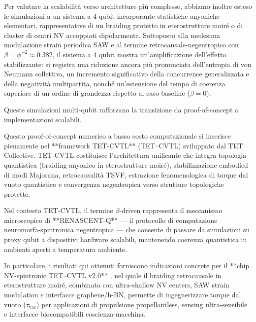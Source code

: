 \documentclass[11pt,a4paper]{article}
\theoremstyle{plain}
\theoremstyle{definition}
\begin{document}
Per valutare la scalabilità verso architetture più complesse, abbiamo inoltre esteso le simulazioni a un sistema a 4 qubit incorporante statistiche anyoniche elementari, rappresentative di un braiding protetto in eterostrutture moiré o di cluster di centri NV accoppiati dipolarmente. Sottoposto alla medesima modulazione strain periodica SAW e al termine retrocausale-negentropico con $\beta = \phi^{-2} \approx 0.382$, il sistema a 4 qubit mostra un'amplificazione dell'effetto stabilizzante: si registra una riduzione ancora più pronunciata dell'entropia di von Neumann collettiva, un incremento significativo della concurrence generalizzata e della negatività multipartita, nonché un'estensione del tempo di coerenza superiore di un ordine di grandezza rispetto al caso baseline ($\beta=0$). 



Queste simulazioni multi-qubit rafforzano la transizione da proof-of-concept a implementazioni scalabili.

\vspace{0.2cm}

Questo proof-of-concept numerico a basso costo computazionale si inserisce pienamente nel **framework TET-CVTL** (TET–CVTL) sviluppato dal TET Collective. TET-CVTL costituisce l’architettura unificante che integra topologia quantistica (braiding anyonico in eterostrutture moiré), stabilizzazione embodied di modi Majorana, retrocausalità TSVF, estrazione fenomenologica di torque dal vuoto quantistico e convergenza negentropica verso strutture topologiche protette. 

\vspace{0.2cm}

Nel contesto TET-CVTL, il termine $\beta$-driven rappresenta il meccanismo microscopico di **RENASCENT-Q** — il protocollo di computazione neuromorfa-spintronica negentropica — che consente di passare da simulazioni su proxy qubit a dispositivi hardware scalabili, mantenendo coerenza quantistica in ambienti aperti a temperatura ambiente.

In particolare, i risultati qui ottenuti forniscono indicazioni concrete per il **chip NV-spintronic TET–CVTL v2.0** \href{https://doi.org/10.5281/zenodo.19109980}, nel quale il braiding retrocausale in eterostrutture moiré, combinato con ultra-shallow NV centers, SAW strain modulation e interfacce graphene/h-BN, permette di ingegnerizzare torque dal vuoto ($\tau_{\text{vac}}$) per applicazioni di propulsione propellantless, sensing ultra-sensibile e interfacce biocompatibili coscienza-macchina. 
\end{document}
